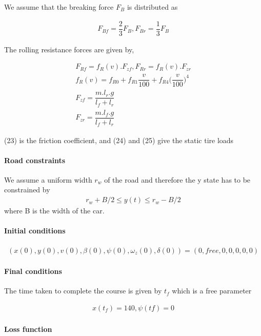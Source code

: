 \documentclass{article}
\begin{document}
We assume that the breaking force \(F_B\) is distributed as

\begin{align}
    F_{Bf} = \dfrac{2}{3}F_B, F_{Br} = \dfrac{1}{3}F_B
\end{align}

The rolling resistance forces are given by,

\begin{align}
    F_{Rf} = f_R(v).F_{zf}, F_{Rr} = f_R(v).F_{zr}\\
    f_R(v) = f_{R0} + f_{R1}\dfrac{v}{100} + f_{R4}\bigg(\dfrac{v}{100}\bigg)^4\\
    F_{zf} = \dfrac{m.l_r.g}{l_f + l_r}\\
    F_{zr} = \dfrac{m.l_f.g}{l_f + l_r}
\end{align}

(23) is the friction coefficient, and (24) and (25) give the static tire loads

\paragraph{Road constraints}
We assume a uniform width \( r_w\) of the road and therefore the y state has to be constrained by 
\begin{align}
    r_w + B/2 \leq y(t) \leq r_w - B/2
\end{align}
where B is the width of the car.

\paragraph{Initial conditions}
\begin{align}
    (x(0), y(0), v(0), \beta(0), \psi(0), \omega_z(0), \delta(0)) = 
    (0, free, 0, 0, 0, 0, 0)
\end{align}

\paragraph{Final conditions}

The time taken to complete the course is given by \(t_f\) which is a free parameter

\begin{align}
    x(t_f) = 140, \psi(tf) = 0
\end{align}

\paragraph{Loss function}
\end{document}
